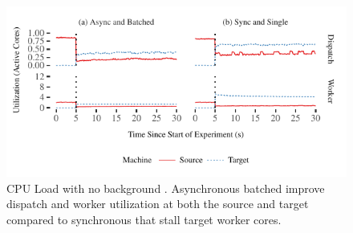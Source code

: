 \begin{figure}[t]
\centering
\includegraphics[width=1.0\columnwidth]{graphs/running-dispatch-worker-only-priority}
  \caption{CPU Load with no background \pulls. Asynchronous batched \priopulls
  improve dispatch and worker utilization at both the source and target
  compared to synchronous \pulls that stall target worker cores.}
\label{fig:batching-load}
\end{figure}
